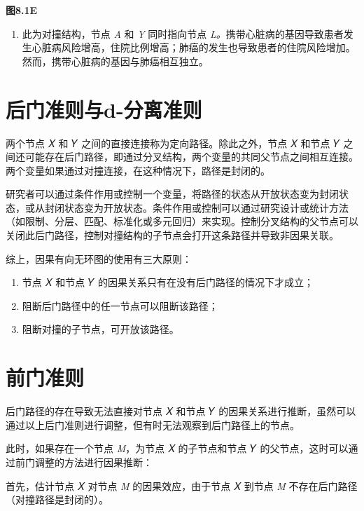 \documentclass[
  chinese-hans,
  letterpaper,
  DIV=11,
  numbers=noendperiod]{scrreprt}
\providecommand{\tightlist}{%
  \setlength{\itemsep}{0pt}\setlength{\parskip}{0pt}}
\begin{document}
\textbf{图8.1E}

\begin{enumerate}
\def\labelenumi{\arabic{enumi}.}
\setcounter{enumi}{4}
\tightlist
\item
  此为对撞结构，节点 \emph{A} 和 \emph{Y} 同时指向节点
  \emph{L。}携带心脏病的基因导致患者发生心脏病风险增高，住院比例增高；肺癌的发生也导致患者的住院风险增加。然而，携带心脏病的基因与肺癌相互独立。
\end{enumerate}

\section{后门准则与d-分离准则}\label{ux540eux95e8ux51c6ux5219ux4e0ed-ux5206ux79bbux51c6ux5219}

两个节点 𝑋 和 𝑌 之间的直接连接称为定向路径。除此之外，节点 𝑋 和节点 𝑌
之间还可能存在后门路径，即通过分叉结构，两个变量的共同父节点之间相互连接。两个变量如果通过对撞连接，在这种情况下，路径是封闭的。

研究者可以通过条件作用或控制一个变量，将路径的状态从开放状态变为封闭状态，或从封闭状态变为开放状态。条件作用或控制可以通过研究设计或统计方法（如限制、分层、匹配、标准化或多元回归）来实现。控制分叉结构的父节点可以关闭此后门路径，控制对撞结构的子节点会打开这条路径并导致非因果关联。

综上，因果有向无环图的使用有三大原则：

\begin{enumerate}
\def\labelenumi{\arabic{enumi}.}
\item
  节点 𝑋 和节点 𝑌 的因果关系只有在没有后门路径的情况下才成立；
\item
  阻断后门路径中的任一节点可以阻断该路径；
\item
  阻断对撞的子节点，可开放该路径。
\end{enumerate}

\section{前门准则}\label{ux524dux95e8ux51c6ux5219}

后门路径的存在导致无法直接对节点 𝑋 和节点 𝑌
的因果关系进行推断，虽然可以通过以上后门准则进行调整，但有时无法观察到后门路径上的节点。

此时，如果存在一个节点 \emph{M}，为节点 𝑋 的子节点和节点 𝑌
的父节点，这时可以通过前门调整的方法进行因果推断：

首先，估计节点 𝑋 对节点 \emph{M} 的因果效应，由于节点 𝑋 到节点 \emph{M}
不存在后门路径（对撞路径是封闭的）。
\end{document}
